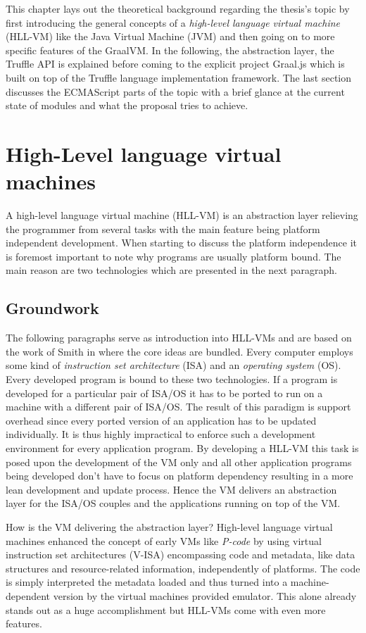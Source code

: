 This chapter lays out the theoretical background regarding the thesis's topic by first introducing the general concepts of a \emph{high-level language virtual machine} (HLL-VM) like the Java Virtual Machine (JVM) and then going on to more specific features of the GraalVM. In the following, the abstraction layer, the Truffle API is explained before coming to the explicit project Graal.js which is built on top of the Truffle language implementation framework. The last section discusses the ECMAScript parts of the topic with a brief glance at the current state of modules and what the proposal tries to achieve.

\section{High-Level language virtual machines}
A high-level language virtual machine (HLL-VM) is an abstraction layer relieving the programmer from several tasks with the main feature being platform independent development. When starting to discuss the platform independence it is foremost important to note why programs are usually platform bound. The main reason are two technologies which are presented in the next paragraph.

\subsection{Groundwork}
The following paragraphs serve as introduction into HLL-VMs and are based on the work of Smith in \cite{Smith} where the core ideas are bundled. Every computer employs some kind of \emph{instruction set architecture} (ISA) and an \emph{operating system} (OS). Every developed program is bound to these two technologies. If a program is developed for a particular pair of ISA/OS it has to be ported to run on a machine with a different pair of ISA/OS. The result of this paradigm is support overhead since every ported version of an application has to be updated individually. It is thus highly impractical to enforce such a development environment for every application program. By developing a HLL-VM this task is posed upon the development of the VM only and all other application programs being developed don't have to focus on platform dependency resulting in a more lean development and update process. Hence the VM delivers an abstraction layer for the ISA/OS couples and the applications running on top of the VM. \cite{Smith} 

How is the VM delivering the abstraction layer? High-level language virtual machines enhanced the concept of early VMs like \emph{P-code} \cite{pCode} by using virtual instruction set architectures (V-ISA) encompassing code and metadata, like data structures and resource-related information, independently of platforms. The code is simply interpreted the metadata loaded and thus turned into a machine-dependent version by the virtual machines provided emulator. \cite{Smith} This alone already stands out as a huge accomplishment but HLL-VMs come with even more features.

